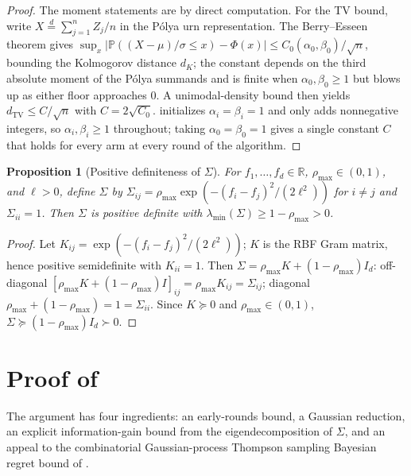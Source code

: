 \documentclass{article}
\theoremstyle{plain}
\newtheorem{proposition}[theorem]{Proposition}
\theoremstyle{definition}
\theoremstyle{remark}
\newcommand{\R}{\mathbb{R}}
\newcommand{\Prob}{\mathbb{P}}
\begin{document}
\begin{proof}
The moment statements are by direct computation.
For the TV bound, write $X \stackrel{d}{=} \sum_{j=1}^{n} Z_j / n$ in the P\'{o}lya urn representation.
The Berry--Esseen theorem \citep{berry1941accuracy} gives $\sup_x |\Prob((X-\mu)/\sigma \leq x) - \Phi(x)| \leq C_0(\alpha_0, \beta_0) / \sqrt{n}$, bounding the Kolmogorov distance $d_K$; the constant depends on the third absolute moment of the Pólya summands and is finite when $\alpha_0, \beta_0 \geq 1$ but blows up as either floor approaches $0$.
A unimodal-density bound then yields $d_{\mathrm{TV}} \leq C/\sqrt{n}$ with $C = 2\sqrt{C_0}$.
 initializes $\alpha_i = \beta_i = 1$ and only adds nonnegative integers, so $\alpha_i, \beta_i \geq 1$ throughout; taking $\alpha_0 = \beta_0 = 1$ gives a single constant $C$ that holds for every arm at every round of the algorithm.
\end{proof}

\begin{proposition}[Positive definiteness of $\Sigma$]\label{prop:pd}
For $f_1, \ldots, f_d \in \R$, $\rho_{\max} \in (0,1)$, and $\ell > 0$, define $\Sigma$ by $\Sigma_{ij} = \rho_{\max} \exp(-(f_i - f_j)^2 / (2\ell^2))$ for $i \neq j$ and $\Sigma_{ii} = 1$.
Then $\Sigma$ is positive definite with $\lambda_{\min}(\Sigma) \geq 1 - \rho_{\max} > 0$.
\end{proposition}

\begin{proof}
Let $K_{ij} = \exp(-(f_i - f_j)^2 / (2\ell^2))$; $K$ is the RBF Gram matrix, hence positive semidefinite with $K_{ii} = 1$.
Then $\Sigma = \rho_{\max} K + (1 - \rho_{\max}) I_d$: off-diagonal $[\rho_{\max} K + (1-\rho_{\max}) I]_{ij} = \rho_{\max} K_{ij} = \Sigma_{ij}$; diagonal $\rho_{\max} + (1-\rho_{\max}) = 1 = \Sigma_{ii}$.
Since $K \succeq 0$ and $\rho_{\max} \in (0,1)$,
$\Sigma \succeq (1 - \rho_{\max}) I_d \succ 0$.
\end{proof}

\section{Proof of }\label{app:bayes}

The argument has four ingredients: an early-rounds bound, a Gaussian reduction, an explicit information-gain bound from the eigendecomposition of $\Sigma$, and an appeal to the combinatorial Gaussian-process Thompson sampling Bayesian regret bound of \citet{sandberg2025bayesian}.
\end{document}
